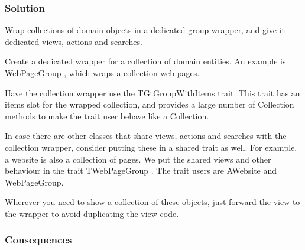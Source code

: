 \documentclass[sigconf]{acmart}
\begin{document}
\subsubsection*{Solution}

Wrap collections of domain objects in a dedicated group wrapper, and give it dedicated views, actions and searches.

Create a dedicated wrapper for a collection of domain entities. An example is WebPageGroup , which wraps a collection web pages.

Have the collection wrapper use the TGtGroupWithItems trait. This trait has an items slot for the wrapped collection, and provides a large number of Collection methods to make the trait user behave like a Collection.

In case there are other classes that share views, actions and searches with the collection wrapper, consider putting these in a shared trait as well. For example, a website is also a collection of pages. We put the shared views and other behaviour in the trait TWebPageGroup . The trait users are AWebsite and WebPageGroup.

Wherever you need to show a collection of these objects, just forward the view to the wrapper to avoid duplicating the view code. 


\subsubsection*{Consequences}



\end{document}
